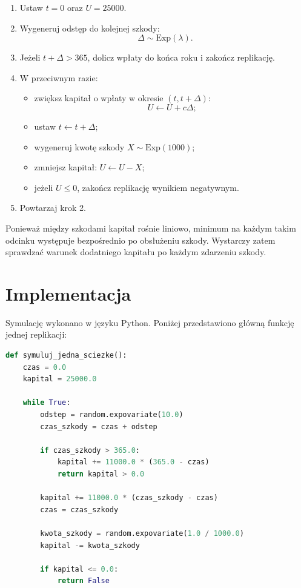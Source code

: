 \documentclass[12pt,a4paper]{article}
\newcommand{\sekcjazwstep}[2]{%
  \Needspace{10\baselineskip}%
  \section*{#1}%
  \nopagebreak[4]%
  #2%
}
\begin{document}
\begin{enumerate}
    \item Ustaw $t=0$ oraz $U=25000$.
    \item Wygeneruj odstęp do kolejnej szkody:
    \[
    \Delta \sim \mathrm{Exp}(\lambda).
    \]
    \item Jeżeli $t+\Delta>365$, dolicz wpłaty do końca roku i zakończ replikację.
    \item W przeciwnym razie:
    \begin{itemize}
        \item zwiększ kapitał o wpłaty w okresie $(t,t+\Delta)$:
        \[
        U \leftarrow U + c\Delta;
        \]
        \item ustaw $t\leftarrow t+\Delta$;
        \item wygeneruj kwotę szkody $X\sim \mathrm{Exp}(1000)$;
        \item zmniejsz kapitał: $U\leftarrow U-X$;
        \item jeżeli $U\le 0$, zakończ replikację wynikiem negatywnym.
    \end{itemize}
    \item Powtarzaj krok 2.
\end{enumerate}

Ponieważ między szkodami kapitał rośnie liniowo, minimum na każdym takim
odcinku występuje bezpośrednio po obsłużeniu szkody. Wystarczy zatem sprawdzać
warunek dodatniego kapitału po każdym zdarzeniu szkody.

\sekcjazwstep{Implementacja}{%
Symulację wykonano w języku Python. Poniżej przedstawiono główną funkcję
jednej replikacji:
}

\begin{lstlisting}[language=Python]
def symuluj_jedna_sciezke():
    czas = 0.0
    kapital = 25000.0

    while True:
        odstep = random.expovariate(10.0)
        czas_szkody = czas + odstep

        if czas_szkody > 365.0:
            kapital += 11000.0 * (365.0 - czas)
            return kapital > 0.0

        kapital += 11000.0 * (czas_szkody - czas)
        czas = czas_szkody

        kwota_szkody = random.expovariate(1.0 / 1000.0)
        kapital -= kwota_szkody

        if kapital <= 0.0:
            return False
\end{lstlisting}
\end{document}
